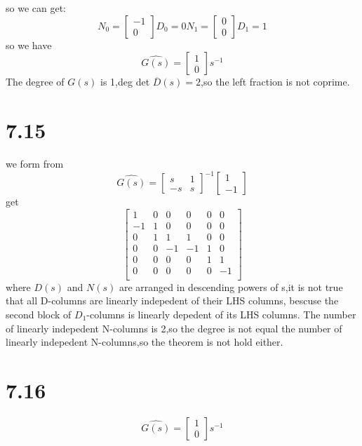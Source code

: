 \documentclass{article}
\begin{document}
so we can get:
\[
N_0=\left[
    \begin{array}{c}
        -1\\
        0
    \end{array}
\right]    
D_0=0
N_1=\left[
    \begin{array}{c}
        0\\
        0
    \end{array}
\right]
D_1=1   
\]
so we have
\[
    \hat{G(s)}=
    \left[
        \begin{array}{c}
          1\\
          0
        \end{array}
    \right]s^{-1}   
\]
The degree of $G(s)$ is 1,deg det $\overline{D}(s)=2$,so the left fraction is not coprime.

\section*{7.15}
we form from 
\[\hat{G(s)}=
\left[
    \begin{array}{cc}
        s & 1\\
        -s & s
    \end{array}
\right]^{-1}
\left[
    \begin{array}{c}
        1\\
        -1
    \end{array}
\right]
\]
 get 
\[
\left[
    \begin{array}{cccccc}
    1 & 0& 0 & 0 & 0 & 0 \\
    -1  & 1  & 0& 0 & 0 & 0 \\
    0  & 1  & 1 & 1 & 0 & 0 \\
    0  & 0  & -1 & -1 & 1 & 0\\
    0  & 0 & 0 & 0 & 1 &1 \\
    0 & 0 &0 & 0 & 0 & -1\\
    \end{array}
\right]
\]
where $D(s)$ and $N(s)$ are arranged in descending powers of s,it is not true that all D-columns are linearly indepedent of their LHS columns, bescuse the second block of $D_1$-columns is linearly depedent of its LHS columns.
The number of linearly indepedent N-columns is 2,so the degree is not equal the number of linearly indepedent N-columns,so the theorem is not hold either.

\section*{7.16}
\[
    \hat{G(s)}=
    \left[
        \begin{array}{c}
          1\\
          0
        \end{array}
    \right]s^{-1}   
\]
\end{document}
